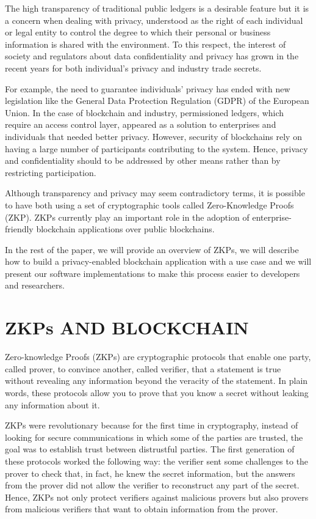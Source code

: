 \documentclass{IEEEcsmag}
\begin{document}
The high transparency of traditional public ledgers is a desirable feature but
it is a concern when dealing with privacy,
understood as the right of each individual or legal entity to control the degree 
to which their personal or business information is shared with the environment.
To this respect, the interest of society and regulators about data confidentiality  
and privacy has grown in the recent years for both individual's privacy and industry trade secrets. 

For example, the need to guarantee 
individuals' privacy has ended with new 
legislation like the General Data Protection Regulation (GDPR) of the European Union. 
In the case of blockchain and industry, 
permissioned ledgers, which require an access control layer, appeared as a solution to enterprises and individuals that needed better privacy. 
However, security of blockchains rely on having a large number of participants contributing to the system. Hence, 
privacy and confidentiality should to be addressed by other means 
rather than by restricting participation. 

Although transparency and privacy may seem contradictory terms, it is possible to have both using a set of cryptographic tools called Zero-Knowledge Proofs (ZKP). 
ZKPs currently play an important role in the adoption of 
enterprise-friendly blockchain applications over public blockchains.

In the rest of the paper, we will provide an overview of ZKPs,
we will describe how to build a privacy-enabled blockchain application with
a use case and we will present our software implementations to make
this process easier to developers and researchers.


\section{ZKPs AND BLOCKCHAIN}

Zero-knowledge Proofs (ZKPs) are cryptographic protocols that 
enable one party, called prover, to convince another, called 
verifier, that a statement is true without revealing any 
information beyond the veracity of the statement. 
In plain words, these protocols allow you to prove that you know a secret 
without leaking any information about it.

ZKPs were revolutionary because for the first time in 
cryptography, instead of looking for secure communications 
in which some of the parties are trusted, the goal was to
establish trust between distrustful parties. 
The first generation of these protocols worked the following way: 
the verifier sent some challenges to the 
prover to check that, in fact, he knew the secret 
information, but the answers from the prover did not allow 
the verifier to reconstruct any part of the secret. 
Hence, ZKPs not only protect verifiers 
against malicious provers but also provers from malicious 
verifiers that want to obtain information from the prover.
\end{document}
